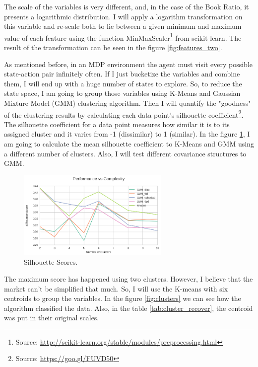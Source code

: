 \documentclass[a4paper]{article}
\begin{document}
The scale of the variables is very different, and, in the case of the Book Ratio, it presents a logarithmic distribution. I will apply a logarithm transformation on this variable and re-scale both to lie between a given minimum and maximum value of each feature using the function MinMaxScaler\footnote{Source: \url{http://scikit-learn.org/stable/modules/preprocessing.html}} from scikit-learn. The result of the transformation can be seen in the figure \ref{fig:features_two}.

As mentioned before, in an MDP environment the agent must visit every possible state-action pair infinitely often. If I just bucketize the variables and combine them, I will end up with a huge number of states to explore. So, to reduce the state space, I am going to group those variables using K-Means and Gaussian Mixture Model (GMM) clustering algorithm. Then I will quantify the "goodness" of the clustering results by calculating each data point's silhouette coefficient\footnote{Source: \url{https://goo.gl/FUVD50}}. The silhouette coefficient for a data point measures how similar it is to its assigned cluster and it varies from -1 (dissimilar) to 1 (similar). In the figure \ref{fig:scores}, I am going to calculate the mean silhouette coefficient to K-Means and GMM using a different number of clusters. Also, I will test different covariance structures to GMM.

\begin{figure}[ht]
\centering
\includegraphics[width=0.65\textwidth]{figures/cluster_scores.png}
\caption{\label{fig:scores}Silhouette Scores.}
\end{figure}

The maximum score has happened using two clusters. However, I believe that the market can't be simplified that much. So, I will use the K-means with six centroids to group the variables. In the figure \ref{fig:clusters} we can see how the algorithm classified the data. Also, in the table \ref{tab:cluster_recover}, the centroid was put in their original scales.
\end{document}
